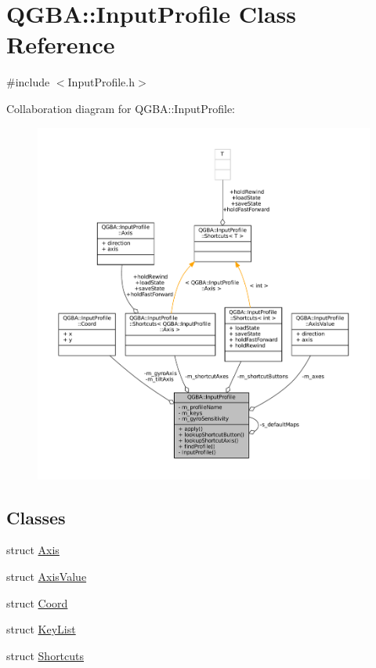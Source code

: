 \hypertarget{class_q_g_b_a_1_1_input_profile}{}\section{Q\+G\+BA\+:\+:Input\+Profile Class Reference}
\label{class_q_g_b_a_1_1_input_profile}


{\ttfamily \#include $<$Input\+Profile.\+h$>$}



Collaboration diagram for Q\+G\+BA\+:\+:Input\+Profile\+:
\nopagebreak
\begin{figure}[H]
\begin{center}
\leavevmode
\includegraphics[width=350pt]{class_q_g_b_a_1_1_input_profile__coll__graph}
\end{center}
\end{figure}
\subsection*{Classes}
\begin{DoxyCompactItemize}
\item 
struct \mbox{\hyperlink{class_q_g_b_a_1_1_input_profile_struct_q_g_b_a_1_1_input_profile_1_1_axis}{Axis}}
\item 
struct \mbox{\hyperlink{class_q_g_b_a_1_1_input_profile_struct_q_g_b_a_1_1_input_profile_1_1_axis_value}{Axis\+Value}}
\item 
struct \mbox{\hyperlink{class_q_g_b_a_1_1_input_profile_struct_q_g_b_a_1_1_input_profile_1_1_coord}{Coord}}
\item 
struct \mbox{\hyperlink{class_q_g_b_a_1_1_input_profile_struct_q_g_b_a_1_1_input_profile_1_1_key_list}{Key\+List}}
\item 
struct \mbox{\hyperlink{class_q_g_b_a_1_1_input_profile_struct_q_g_b_a_1_1_input_profile_1_1_shortcuts}{Shortcuts}}
\end{DoxyCompactItemize}
